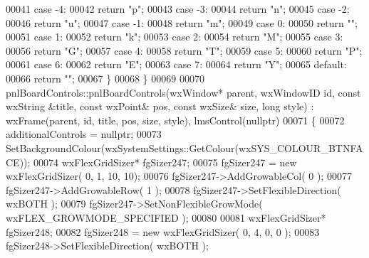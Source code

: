 \begin{DoxyCode}
00041     \textcolor{keywordflow}{case} -4:
00042         \textcolor{keywordflow}{return} \textcolor{stringliteral}{"p"};
00043     \textcolor{keywordflow}{case} -3:
00044         \textcolor{keywordflow}{return} \textcolor{stringliteral}{"n"};
00045     \textcolor{keywordflow}{case} -2:
00046         \textcolor{keywordflow}{return} \textcolor{stringliteral}{"u"};
00047     \textcolor{keywordflow}{case} -1:
00048         \textcolor{keywordflow}{return} \textcolor{stringliteral}{"m"};
00049     \textcolor{keywordflow}{case} 0:
00050         \textcolor{keywordflow}{return} \textcolor{stringliteral}{""};
00051     \textcolor{keywordflow}{case} 1:
00052         \textcolor{keywordflow}{return} \textcolor{stringliteral}{"k"};
00053     \textcolor{keywordflow}{case} 2:
00054         \textcolor{keywordflow}{return} \textcolor{stringliteral}{"M"};
00055     \textcolor{keywordflow}{case} 3:
00056         \textcolor{keywordflow}{return} \textcolor{stringliteral}{"G"};
00057     \textcolor{keywordflow}{case} 4:
00058         \textcolor{keywordflow}{return} \textcolor{stringliteral}{"T"};
00059     \textcolor{keywordflow}{case} 5:
00060         \textcolor{keywordflow}{return} \textcolor{stringliteral}{"P"};
00061     \textcolor{keywordflow}{case} 6:
00062         \textcolor{keywordflow}{return} \textcolor{stringliteral}{"E"};
00063     \textcolor{keywordflow}{case} 7:
00064         \textcolor{keywordflow}{return} \textcolor{stringliteral}{"Y"};
00065     \textcolor{keywordflow}{default}:
00066         \textcolor{keywordflow}{return} \textcolor{stringliteral}{""};
00067     \}
00068 \}
00069 
00070 pnlBoardControls::pnlBoardControls(wxWindow* parent, wxWindowID \textcolor{keywordtype}{id}, \textcolor{keyword}{const} wxString &title, \textcolor{keyword}{const} wxPoint& 
      pos, \textcolor{keyword}{const} wxSize& size, \textcolor{keywordtype}{long} style) : wxFrame(parent, id, title, pos, size, style), 
      lmsControl(nullptr)
00071 \{
00072     additionalControls = \textcolor{keyword}{nullptr};
00073     SetBackgroundColour(wxSystemSettings::GetColour(wxSYS\_COLOUR\_BTNFACE));
00074     wxFlexGridSizer* fgSizer247;
00075     fgSizer247 = \textcolor{keyword}{new} wxFlexGridSizer( 0, 1, 10, 10);
00076     fgSizer247->AddGrowableCol( 0 );
00077     fgSizer247->AddGrowableRow( 1 );
00078     fgSizer247->SetFlexibleDirection( wxBOTH );
00079     fgSizer247->SetNonFlexibleGrowMode( wxFLEX\_GROWMODE\_SPECIFIED );
00080 
00081     wxFlexGridSizer* fgSizer248;
00082     fgSizer248 = \textcolor{keyword}{new} wxFlexGridSizer( 0, 4, 0, 0 );
00083     fgSizer248->SetFlexibleDirection( wxBOTH );

\end{DoxyCode}
